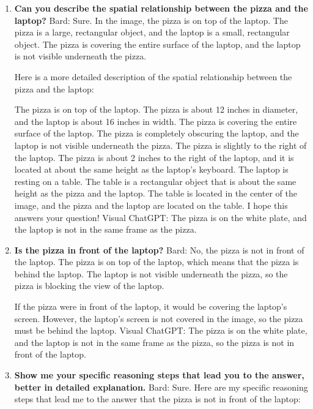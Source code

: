     \begin{enumerate}
        \item \textbf{Can you describe the spatial relationship between the pizza and the laptop?}
        \subitem Bard: 
        Sure. In the image, the pizza is on top of the laptop. The pizza is a large, rectangular object, and the laptop is a small, rectangular object. The pizza is covering the entire surface of the laptop, and the laptop is not visible underneath the pizza.

        Here is a more detailed description of the spatial relationship between the pizza and the laptop:

        The pizza is on top of the laptop. The pizza is about 12 inches in diameter, and the laptop is about 16 inches in width.
        The pizza is covering the entire surface of the laptop. The pizza is completely obscuring the laptop, and the laptop is not visible underneath the pizza.
        The pizza is slightly to the right of the laptop. The pizza is about 2 inches to the right of the laptop, and it is located at about the same height as the laptop's keyboard.
        The laptop is resting on a table. The table is a rectangular object that is about the same height as the pizza and the laptop. The table is located in the center of the image, and the pizza and the laptop are located on the table.
        I hope this answers your question!
        \subitem Visual ChatGPT: The pizza is on the white plate, and the laptop is not in the same frame as the pizza.
        \item \textbf{Is the pizza in front of the laptop?}
        \subitem Bard: No, the pizza is not in front of the laptop. The pizza is on top of the laptop, which means that the pizza is behind the laptop. The laptop is not visible underneath the pizza, so the pizza is blocking the view of the laptop.

        If the pizza were in front of the laptop, it would be covering the laptop's screen. However, the laptop's screen is not covered in the image, so the pizza must be behind the laptop.
        \subitem Visual ChatGPT: The pizza is on the white plate, and the laptop is not in the same frame as the pizza, so the pizza is not in front of the laptop.
        \item \textbf{Show me your specific reasoning steps that lead you to the answer, better in detailed explanation.}
        \subitem Bard: 
        Sure. Here are my specific reasoning steps that lead me to the answer that the pizza is not in front of the laptop:


\end{enumerate}

